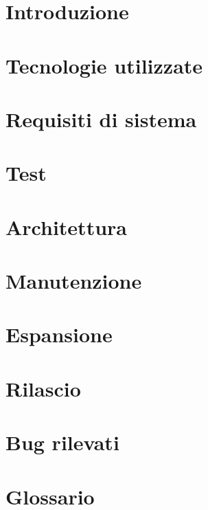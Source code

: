 \documentclass[]{article}
\begin{document}
	
	\newpage
	\tableofcontents
	\newpage
	\listoffigures
	\listoftables
	\newpage


	\section{Introduzione}
	
	\newpage

	\section{Tecnologie utilizzate}
	
	\newpage

	\section{Requisiti di sistema}
	
	\newpage

	\section{Test}
	
	\newpage

	\section{Architettura}
	
	\newpage

	\section{Manutenzione}
	
	\newpage

	\section{Espansione}
	
	\newpage

	\section{Rilascio}
	
	\newpage

	\section{Bug rilevati}
	
	\newpage
	
	\appendix
	\section{Glossario}
	
	\newpage
\end{document}
